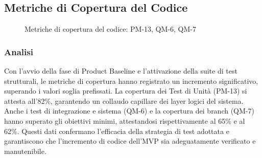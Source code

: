 \documentclass[a4paper,11pt,oneside]{scrartcl}
\begin{document}
\subsection{Metriche di Copertura del Codice}

\begin{figure}[H]
\centering


\caption{Metriche di copertura del codice: PM-13, QM-6, QM-7}
\label{fig:copertura_codice}
\end{figure}

\subsubsection*{Analisi}

Con l'avvio della fase di Product Baseline e l'attivazione della suite di test strutturali, le metriche di copertura hanno registrato un incremento significativo, superando i valori soglia prefissati. La copertura dei Test di Unità (PM-13) si attesta all'82\%, garantendo un collaudo capillare dei layer logici del sistema. Anche i test di integrazione e sistema (QM-6) e la copertura dei branch (QM-7) hanno superato gli obiettivi minimi, attestandosi rispettivamente al 65\% e al 62\%. Questi dati confermano l'efficacia della strategia di test adottata e garantiscono che l'incremento di codice dell'MVP sia adeguatamente verificato e manutenibile.
\end{document}
